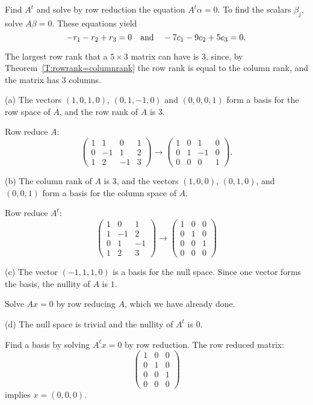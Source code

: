 \documentclass{ximera}
\begin{document}
\soln Find $A^t$ and solve by row reduction the equation
$A^t\alpha = 0$.  To find the scalars $\beta_j$, solve $A\beta =
0$.  These equations yield
\[
-r_1 - r_2 + r_3 = 0 \quad\mbox{and}\quad -7c_1 - 9c_2 + 5c_3 = 0.
\]

 The largest row rank that a $5 \times 3$ matrix can have
is $3$, since, by Theorem~\ref{T:rowrank=columnrank} the row rank is
equal to the column rank, and the matrix has $3$ columns.

(a) \ans The vectors $(1,0,1,0)$, $(0,1,-1,0)$ and $(0,0,0,1)$ form a
basis for the row space of $A$, and the row rank of $A$ is $3$.

\soln Row reduce $A$:
\[
\left(\begin{array}{rrrr} 1 & 1 & 0 & 1 \\ 0 & -1 & 1 & 2 \\1 & 2
& -1 & 3 \end{array}\right) \longrightarrow \left(\begin{array}{rrrr}
1 & 0 & 1 & 0 \\ 0 & 1 & -1 & 0 \\0 & 0 & 0 & 1 \end{array}\right).
\]

(b) \ans The column rank of $A$ is $3$, and the vectors $(1,0,0)$,
$(0,1,0)$, and $(0,0,1)$ form a basis for the column space of $A$.

\soln Row reduce $A^t$:
\[
\left(\begin{array}{rrr} 1 & 0 & 1 \\ 1 & -1 & 2 \\ 0 & 1 & -1
\\ 1 & 2 & 3 \end{array}\right) \longrightarrow \left(\begin{array}{rrr}
1 & 0 & 0 \\ 0 & 1 & 0 \\ 0 & 0 & 1 \\ 0 & 0 & 0 \end{array}\right)
\]

(c) \ans The vector $(-1,1,1,0)$ is a basis for the null space.  Since one
vector forms the basis, the nullity of $A$ is $1$.  

\soln Solve $Ax = 0$ by row reducing $A$, which we have already done.

(d) \ans The null space is trivial and the nullity of $A^t$ is $0$.

\soln Find a basis by solving $A^tx = 0$ by row reduction.  The row
reduced matrix:
\[
\left(\begin{array}{rrr} 1 & 0 & 0 \\ 0 & 1 & 0 \\ 0 & 0 & 1
\\ 0 & 0 & 0 \end{array}\right)
\]
implies $x = (0,0,0)$.
\end{document}
